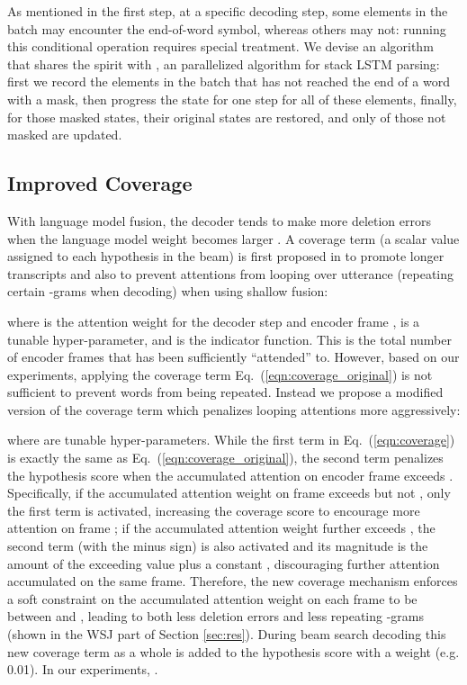 \documentclass{article}
\begin{document}
As mentioned in the first step, at a specific decoding step, some elements in the batch may encounter the end-of-word symbol, whereas others may not: running this conditional operation requires special treatment. We devise an algorithm that shares the spirit with \cite{ding-koehn-2019-parallelizable}, an parallelized algorithm for stack LSTM parsing: first we record the elements in the batch that has not reached the end of a word with a mask, then progress the state for one step for all of these elements, finally, for those masked states, their original states are restored, and only  of those not masked are updated.


\subsection{Improved Coverage}
With language model fusion, the decoder tends to make more deletion errors when the language model weight becomes larger \cite{bahdanau2016end}. A coverage term (a scalar value assigned to each hypothesis in the beam) is first proposed in \cite{chorowski2017towards} to promote longer transcripts and also to prevent attentions from looping over utterance (repeating certain -grams when decoding) when using shallow fusion:

where  is the attention weight for the decoder step  and encoder frame ,  is a tunable hyper-parameter, and  is the indicator function. This is the total number of encoder frames that has been sufficiently ``attended'' to. However, based on our experiments, applying the coverage term Eq.~(\ref{eqn:coverage_original}) is not sufficient to prevent words from being repeated. Instead we propose a modified version of the coverage term which penalizes looping attentions more aggressively:


\noindent where  are tunable hyper-parameters. While the first term in Eq.~(\ref{eqn:coverage}) is exactly the same as Eq.~(\ref{eqn:coverage_original}), the second term penalizes the hypothesis score when the accumulated attention on encoder frame  exceeds . Specifically, if the accumulated attention weight on frame  exceeds  but not , only the first term is activated, increasing the coverage score to encourage more attention on frame ; if the accumulated attention weight further exceeds , the second term (with the minus sign) is also activated and its magnitude is the amount of the exceeding value plus a constant , discouraging further attention accumulated on the same frame. Therefore, the new coverage mechanism enforces a soft constraint on the accumulated attention weight on each frame to be between  and , leading to both less deletion errors and less repeating -grams (shown in the WSJ part of Section \ref{sec:res}). During beam search decoding this new coverage term as a whole is added to the hypothesis score with a weight (e.g. 0.01). In our experiments, .
\end{document}
